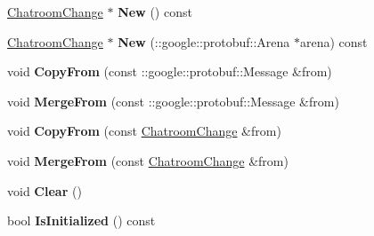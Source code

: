 \begin{DoxyCompactItemize}
\item 
\hypertarget{classSimpleChat_1_1ChatroomChange_adca2bbe6df3f78f3f1235097a7ca9a0b}{\hyperlink{classSimpleChat_1_1ChatroomChange}{Chatroom\-Change} $\ast$ {\bfseries New} () const }\label{classSimpleChat_1_1ChatroomChange_adca2bbe6df3f78f3f1235097a7ca9a0b}

\item 
\hypertarget{classSimpleChat_1_1ChatroomChange_a9de04796e81366af508d61df261b4d6b}{\hyperlink{classSimpleChat_1_1ChatroomChange}{Chatroom\-Change} $\ast$ {\bfseries New} (\-::google\-::protobuf\-::\-Arena $\ast$arena) const }\label{classSimpleChat_1_1ChatroomChange_a9de04796e81366af508d61df261b4d6b}

\item 
\hypertarget{classSimpleChat_1_1ChatroomChange_ac68b686d1309f3ecd6692c191cb854a9}{void {\bfseries Copy\-From} (const \-::google\-::protobuf\-::\-Message \&from)}\label{classSimpleChat_1_1ChatroomChange_ac68b686d1309f3ecd6692c191cb854a9}

\item 
\hypertarget{classSimpleChat_1_1ChatroomChange_aaf17b68dba7ef7f181c9bb217b822887}{void {\bfseries Merge\-From} (const \-::google\-::protobuf\-::\-Message \&from)}\label{classSimpleChat_1_1ChatroomChange_aaf17b68dba7ef7f181c9bb217b822887}

\item 
\hypertarget{classSimpleChat_1_1ChatroomChange_afb801d7bf6377b7c156a62e229f71c5c}{void {\bfseries Copy\-From} (const \hyperlink{classSimpleChat_1_1ChatroomChange}{Chatroom\-Change} \&from)}\label{classSimpleChat_1_1ChatroomChange_afb801d7bf6377b7c156a62e229f71c5c}

\item 
\hypertarget{classSimpleChat_1_1ChatroomChange_a2a314c25282ce98c6e35061a9251107d}{void {\bfseries Merge\-From} (const \hyperlink{classSimpleChat_1_1ChatroomChange}{Chatroom\-Change} \&from)}\label{classSimpleChat_1_1ChatroomChange_a2a314c25282ce98c6e35061a9251107d}

\item 
\hypertarget{classSimpleChat_1_1ChatroomChange_a15422c7efe2e8d9b9ec4782912b53871}{void {\bfseries Clear} ()}\label{classSimpleChat_1_1ChatroomChange_a15422c7efe2e8d9b9ec4782912b53871}

\item 
\hypertarget{classSimpleChat_1_1ChatroomChange_a0ccbfbeaa74853086743b47c9e51e0bb}{bool {\bfseries Is\-Initialized} () const }\label{classSimpleChat_1_1ChatroomChange_a0ccbfbeaa74853086743b47c9e51e0bb}


\end{DoxyCompactItemize}
